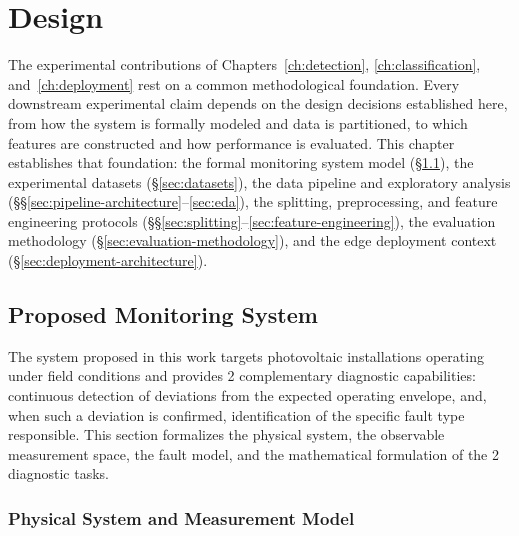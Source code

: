 \chapter{Design}
\label{ch:design}

The experimental contributions of Chapters~\ref{ch:detection}, \ref{ch:classification}, and~\ref{ch:deployment} rest on a common methodological foundation. Every downstream experimental claim depends on the design decisions established here, from how the system is formally modeled and data is partitioned, to which features are constructed and how performance is evaluated. This chapter establishes that foundation: the formal monitoring system model (\S\ref{sec:monitoring-system}), the experimental datasets (\S\ref{sec:datasets}), the data pipeline and exploratory analysis (\S\S\ref{sec:pipeline-architecture}--\ref{sec:eda}), the splitting, preprocessing, and feature engineering protocols (\S\S\ref{sec:splitting}--\ref{sec:feature-engineering}), the evaluation methodology (\S\ref{sec:evaluation-methodology}), and the edge deployment context (\S\ref{sec:deployment-architecture}).

\section{Proposed Monitoring System}
\label{sec:monitoring-system}

The system proposed in this work targets photovoltaic installations operating under field conditions and provides 2 complementary diagnostic capabilities: continuous detection of deviations from the expected operating envelope, and, when such a deviation is confirmed, identification of the specific fault type responsible. This section formalizes the physical system, the observable measurement space, the fault model, and the mathematical formulation of the 2 diagnostic tasks.

\subsection{Physical System and Measurement Model}

